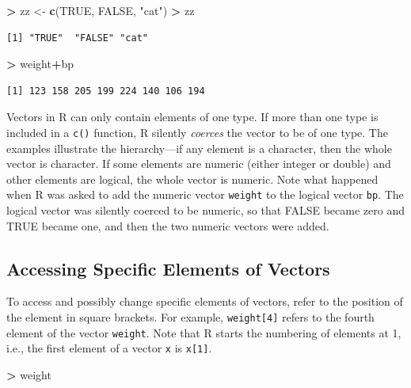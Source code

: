 \documentclass[]{krantz}
\makeatletter
\newenvironment{Shaded}{\begin{snugshade}}{\end{snugshade}}
\newcommand{\KeywordTok}[1]{\textcolor[rgb]{0.27,0.27,0.27}{\textbf{#1}}}
\newcommand{\StringTok}[1]{\textcolor[rgb]{0.5,0.5,0.5}{#1}}
\newcommand{\OtherTok}[1]{\textcolor[rgb]{0.37,0.37,0.37}{#1}}
\newcommand{\OperatorTok}[1]{\textcolor[rgb]{0.43,0.43,0.43}{\textbf{#1}}}
\newcommand{\NormalTok}[1]{#1}
\newenvironment{kframe}{%
\medskip{}
\setlength{\fboxsep}{.8em}
 \def\at@end@of@kframe{}%
 \ifinner\ifhmode%
  \def\at@end@of@kframe{\end{minipage}}%
  \begin{minipage}{\columnwidth}%
 \fi\fi%
 \def\FrameCommand##1{\hskip\@totalleftmargin \hskip-\fboxsep
 \colorbox{shadecolor}{##1}\hskip-\fboxsep
     \hskip-\linewidth \hskip-\@totalleftmargin \hskip\columnwidth}%
 \MakeFramed {\advance\hsize-\width
   \@totalleftmargin\z@ \linewidth\hsize
   \@setminipage}}%
 {\par\unskip\endMakeFramed%
 \at@end@of@kframe}
\renewenvironment{Shaded}{\begin{kframe}}{\end{kframe}}
\makeatother
\begin{document}
\begin{Shaded}
\begin{Highlighting}[]
\OperatorTok{>}\StringTok{ }\NormalTok{zz <-}\StringTok{ }\KeywordTok{c}\NormalTok{(}\OtherTok{TRUE}\NormalTok{, }\OtherTok{FALSE}\NormalTok{, }\StringTok{"cat"}\NormalTok{)}
\OperatorTok{>}\StringTok{ }\NormalTok{zz}
\end{Highlighting}
\end{Shaded}

\begin{verbatim}
[1] "TRUE"  "FALSE" "cat"  
\end{verbatim}

\begin{Shaded}
\begin{Highlighting}[]
\OperatorTok{>}\StringTok{ }\NormalTok{weight}\OperatorTok{+}\NormalTok{bp}
\end{Highlighting}
\end{Shaded}

\begin{verbatim}
[1] 123 158 205 199 224 140 106 194
\end{verbatim}

Vectors in R can only contain elements of one type. If more than one
type is included in a \texttt{c()} function, R silently \emph{coerces}
the vector to be of one type. The examples illustrate the hierarchy---if
any element is a character, then the whole vector is character. If some
elements are numeric (either integer or double) and other elements are
logical, the whole vector is numeric. Note what happened when R was
asked to add the numeric vector \texttt{weight} to the logical vector
\texttt{bp}. The logical vector was silently coerced to be numeric, so
that FALSE became zero and TRUE became one, and then the two numeric
vectors were added.

\subsection{Accessing Specific Elements of
Vectors}\label{accessing-specific-elements-of-vectors}

To access and possibly change specific elements of vectors, refer to the
position of the element in square brackets. For example,
\texttt{weight{[}4{]}} refers to the fourth element of the vector
\texttt{weight}. Note that R starts the numbering of elements at 1,
i.e., the first element of a vector \texttt{x} is \texttt{x{[}1{]}}.

\begin{Shaded}
\begin{Highlighting}[]
\OperatorTok{>}\StringTok{ }\NormalTok{weight}
\end{Highlighting}
\end{Shaded}
\end{document}
